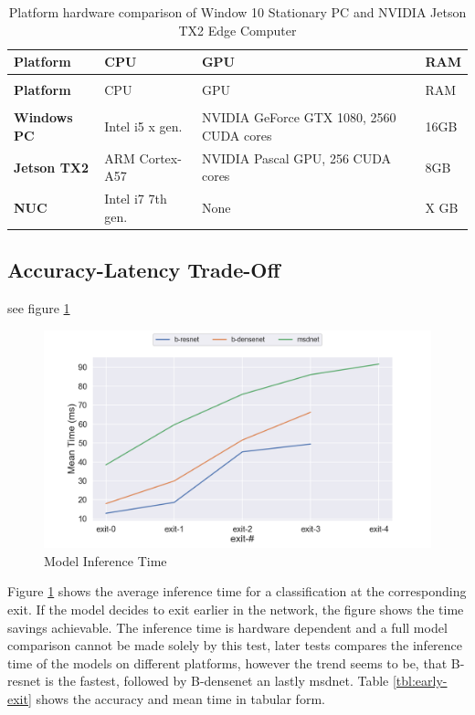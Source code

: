 \begin{longtabu}{>{\bfseries}X|X|X|X}
	\caption[Platform hardware comparison]{Platform hardware comparison of Window 10 Stationary PC and NVIDIA Jetson TX2 Edge Computer} \label{tbl:platforms} \\
	\toprule
	\rowfont{\bfseries}
	Platform & CPU & GPU & RAM  \tabularnewline
	\bottomrule
	\endfirsthead
	\\
	\toprule
	\rowfont{\bfseries}
	Platform & CPU & GPU & RAM  \tabularnewline
	\bottomrule
	\endhead %
	\bottomrule
	\\
	\endfoot
	\hline
	\endlastfoot
	Windows PC	& Intel i5 x gen.	& NVIDIA GeForce GTX 1080, 2560 CUDA cores	& 16GB \tabularnewline
	\hline
	Jetson TX2	& ARM Cortex-A57 	& NVIDIA Pascal GPU, 256 CUDA cores 		& 8GB \tabularnewline
	\hline
	NUC		  	& Intel i7 7th gen.	& None										& X GB \tabularnewline									
	\bottomrule
\end{longtabu}

\subsection{Accuracy-Latency Trade-Off}

 see figure \ref{fig:exit-time}

\begin{figure}
	\includegraphics[width=\linewidth]{figures/inference_plots/exit_time}
	\caption[Model Inference Accuracy]{Model Inference Time}
	\label{fig:exit-time}
\end{figure}



Figure \ref{fig:exit-time} shows the average inference time for a classification at the corresponding exit. If the model decides to exit earlier in the network, the figure shows the time savings achievable. The inference time is hardware dependent and a full model comparison cannot be made solely by this test, later tests compares the inference time of the models on different platforms, however the trend seems to be, that B-\gls{resnet} is the fastest, followed by B-\gls{densenet} an lastly \gls{msdnet}. Table \ref{tbl:early-exit} shows the accuracy and mean time in tabular form.

